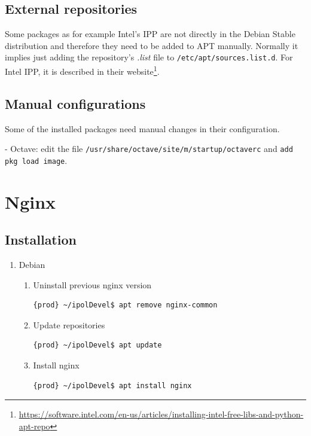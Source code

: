 \documentclass[a4paper,12pt]{article}
\begin{document}
\subsection{External repositories}
Some packages as for example Intel's IPP are not directly in the Debian Stable distribution and therefore they need to be added to APT manually. Normally it implies just adding the repository's \emph{.list} file to {\tt /etc/apt/sources.list.d}.
For Intel IPP, it is described in their website\footnote{\url{https://software.intel.com/en-us/articles/installing-intel-free-libs-and-python-apt-repo}}.


\subsection{Manual configurations}
Some of the installed packages need manual changes in their configuration.

- Octave: edit the file {\tt /usr/share/octave/site/m/startup/octaverc} and {\tt add pkg load image}.


\section{Nginx}

\subsection{Installation}

\begin{enumerate}
\item Debian

\begin{enumerate}
    \item Uninstall previous nginx version
    \begin{lstlisting}[language=Bash]
	{prod} ~/ipolDevel$ apt remove nginx-common
    \end{lstlisting}

    \item Update repositories
    \begin{lstlisting}[language=Bash]
    {prod} ~/ipolDevel$ apt update
    \end{lstlisting}

    \item Install nginx
    \begin{lstlisting}[language=Bash]
    {prod} ~/ipolDevel$ apt install nginx
    \end{lstlisting}
    \end{enumerate}    
\end{enumerate}
\end{document}
